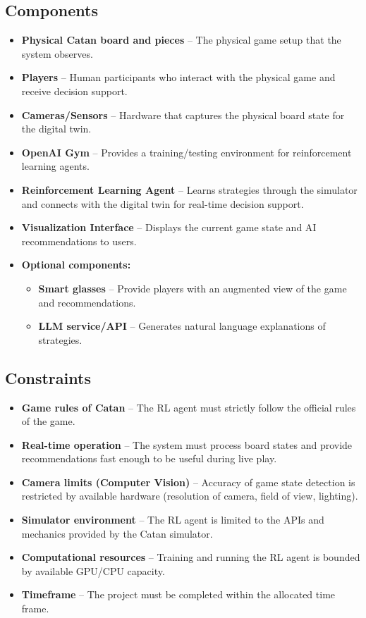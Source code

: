 \documentclass{article}
\begin{document}
\subsection{Components}\label{subsec:components2}
\begin{itemize}
    \item \textbf{Physical Catan board and pieces} – The physical game setup that the system observes.
    \item \textbf{Players} – Human participants who interact with the physical game and receive decision support.
    \item \textbf{Cameras/Sensors} – Hardware that captures the physical board state for the digital twin.
    \item \textbf{OpenAI Gym} – Provides a training/testing environment for reinforcement learning agents.
    \item \textbf{Reinforcement Learning Agent} – Learns strategies through the simulator and connects with the digital twin for real-time decision support.
    \item \textbf{Visualization Interface} – Displays the current game state and AI recommendations to users.
    \item \textbf{Optional components:}
    \begin{itemize}
        \item \textbf{Smart glasses} – Provide players with an augmented view of the game and recommendations.
        \item \textbf{LLM service/API} – Generates natural language explanations of strategies.
    \end{itemize}
\end{itemize}

\subsection{Constraints}\label{subsec:constraints}
\begin{itemize}
    \item \textbf{Game rules of Catan} – The RL agent must strictly follow the official rules of the game.
    \item \textbf{Real-time operation} – The system must process board states and provide recommendations fast enough to be useful during live play.
    \item \textbf{Camera limits (Computer Vision)} – Accuracy of game state detection is restricted by available hardware (resolution of camera, field of view, lighting).
    \item \textbf{Simulator environment} – The RL agent is limited to the APIs and mechanics provided by the Catan simulator.
    \item \textbf{Computational resources} – Training and running the RL agent is bounded by available GPU/CPU capacity.
    \item \textbf{Timeframe} – The project must be completed within the allocated time frame.
\end{itemize}
\end{document}
